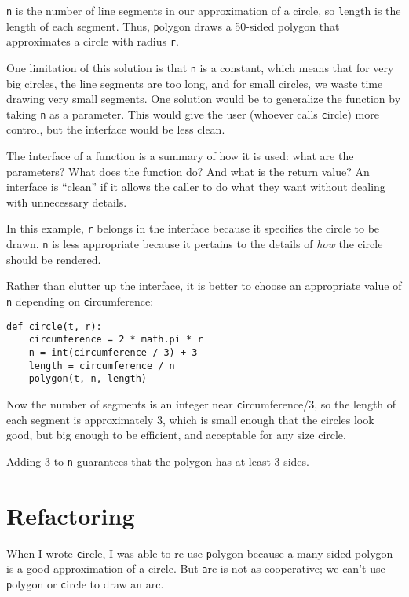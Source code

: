\documentclass[
DIV=11,
fontsize=13,
twoside,
headinclude=false,
titlepage=firstiscover,
abstract=true,
headsepline=true,
footsepline=true,
chapterprefix=true, %
headings=big,
bibliography=totoc,%
captions=tableheading
]{scrbook}
\theoremstyle{definition}
\begin{document}
{\texttt n} is the number of line segments in our approximation of a circle,
so {\texttt length} is the length of each segment.  Thus, {\texttt polygon}
draws a 50-sided polygon that approximates a circle with radius {\texttt r}.

One limitation of this solution is that {\texttt n} is a constant, which
means that for very big circles, the line segments are too long, and
for small circles, we waste time drawing very small segments.  One
solution would be to generalize the function by taking {\texttt n} as
a parameter.  This would give the user (whoever calls {\texttt circle})
more control, but the interface would be less clean.

The {\textbf interface} of a function is a summary of how it is used: what
are the parameters?  What does the function do?  And what is the return
value?  An interface is ``clean'' if it allows the caller to do
what they want without dealing with unnecessary details.

In this example, {\texttt r} belongs in the interface because it
specifies the circle to be drawn.  {\texttt n} is less appropriate
because it pertains to the details of {\em how} the circle should
be rendered.

Rather than clutter up the interface, it is better
to choose an appropriate value of {\texttt n}
depending on {\texttt circumference}:

\begin{lstlisting}
def circle(t, r):
    circumference = 2 * math.pi * r
    n = int(circumference / 3) + 3
    length = circumference / n
    polygon(t, n, length)
\end{lstlisting}
%
Now the number of segments is an integer near {\texttt circumference/3},
so the length of each segment is approximately 3, which is small
enough that the circles look good, but big enough to be efficient,
and acceptable for any size circle.

Adding 3 to {\texttt n} guarantees that the polygon has at least 3 sides.


\section{Refactoring}
\label{refactoring}

When I wrote {\texttt circle}, I was able to re-use {\texttt polygon}
because a many-sided polygon is a good approximation of a circle.
But {\texttt arc} is not as cooperative; we can't use {\texttt polygon}
or {\texttt circle} to draw an arc.
\end{document}
